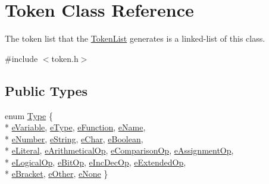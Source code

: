 \hypertarget{class_token}{\section{Token Class Reference}
\label{class_token}
}


The token list that the \hyperlink{class_token_list}{Token\-List} generates is a linked-\/list of this class.  




{\ttfamily \#include $<$token.\-h$>$}

\subsection*{Public Types}
\begin{DoxyCompactItemize}
\item 
enum \hyperlink{class_token_acf70e9411196c602738c3ed2428c7137}{Type} \{ \\*
\hyperlink{class_token_acf70e9411196c602738c3ed2428c7137a72141525c430df12976aa1490aced39a}{e\-Variable}, 
\hyperlink{class_token_acf70e9411196c602738c3ed2428c7137aafb437c16479034b48aea437408e5afb}{e\-Type}, 
\hyperlink{class_token_acf70e9411196c602738c3ed2428c7137aafdfd76298687d7f4b4ed2cde52f3ba1}{e\-Function}, 
\hyperlink{class_token_acf70e9411196c602738c3ed2428c7137a1573e7bc8e749e7adf863a6e90a8892d}{e\-Name}, 
\\*
\hyperlink{class_token_acf70e9411196c602738c3ed2428c7137a0ce211b3a0a0fb8b6f9578030286eb43}{e\-Number}, 
\hyperlink{class_token_acf70e9411196c602738c3ed2428c7137a281a3ba392e7fb364b80f291be3e7a0d}{e\-String}, 
\hyperlink{class_token_acf70e9411196c602738c3ed2428c7137a5792bbbd8812aebc06a99d8b7ea349ec}{e\-Char}, 
\hyperlink{class_token_acf70e9411196c602738c3ed2428c7137a6e803693ab41d096bcb92cc27fdc8946}{e\-Boolean}, 
\\*
\hyperlink{class_token_acf70e9411196c602738c3ed2428c7137a0b59fbc13c9267292652a3d5985127e5}{e\-Literal}, 
\hyperlink{class_token_acf70e9411196c602738c3ed2428c7137a486ff206f8d1875c68c041dbe8575a19}{e\-Arithmetical\-Op}, 
\hyperlink{class_token_acf70e9411196c602738c3ed2428c7137a044175207c2cc48f30819fa6314fffb1}{e\-Comparison\-Op}, 
\hyperlink{class_token_acf70e9411196c602738c3ed2428c7137aa0e55ea46f79e3e9f3f59d2327ac3a75}{e\-Assignment\-Op}, 
\\*
\hyperlink{class_token_acf70e9411196c602738c3ed2428c7137a84e210adc032fff26d2ef9a763a9848a}{e\-Logical\-Op}, 
\hyperlink{class_token_acf70e9411196c602738c3ed2428c7137a91f25b327a082820fb484f77a1f9da49}{e\-Bit\-Op}, 
\hyperlink{class_token_acf70e9411196c602738c3ed2428c7137afeb57aa2a48d349ea35958733356ae99}{e\-Inc\-Dec\-Op}, 
\hyperlink{class_token_acf70e9411196c602738c3ed2428c7137a8262e30f29389cf3f08d845c236ba44d}{e\-Extended\-Op}, 
\\*
\hyperlink{class_token_acf70e9411196c602738c3ed2428c7137aa99b86a4638cae7c0f114daf8b82a6c0}{e\-Bracket}, 
\hyperlink{class_token_acf70e9411196c602738c3ed2428c7137a00c4ad28a28824bc60eb36222f25c562}{e\-Other}, 
\hyperlink{class_token_acf70e9411196c602738c3ed2428c7137a70c5047567b3fc705ee232256a4c92c0}{e\-None}
 \}
\end{DoxyCompactItemize}
